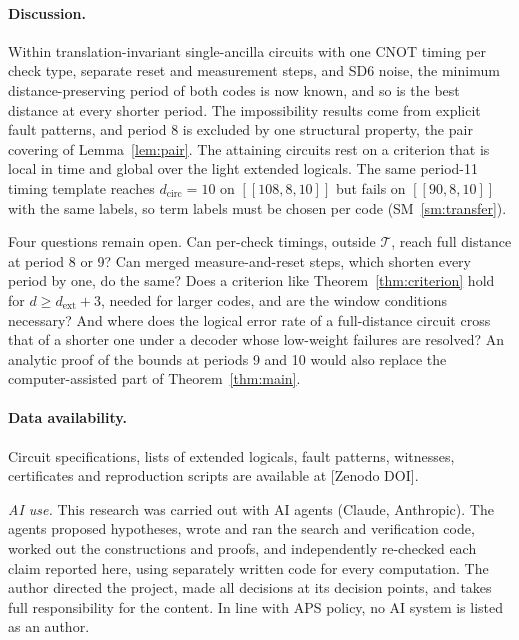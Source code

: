\documentclass[aps,prl,twocolumn,superscriptaddress,nofootinbib]{revtex4-2}
\newif\ifshowclaimtags \showclaimtagsfalse
\newcommand{\cl}[1]{\ifshowclaimtags\textsuperscript{\textcolor{blue}{\scriptsize[#1]}}\fi}
\newcommand{\dcirc}{d_{\mathrm{circ}}}
\newcommand{\dext}{d_{\mathrm{ext}}}
\newcommand{\code}[1]{[[#1]]}
\newcommand{\T}{\mathcal{T}}
\begin{document}
\paragraph{Discussion.}
Within translation-invariant single-ancilla circuits with one CNOT timing per check type,
separate reset and measurement steps, and SD6 noise, the minimum distance-preserving
period of both codes is now known, and so is the best distance at every shorter period.
The impossibility results come from explicit fault patterns, and period 8 is excluded by one
structural property, the pair covering of Lemma~\ref{lem:pair}. The attaining circuits rest on
a criterion that is local in time and global over the light extended logicals. The same
period-11 timing template reaches $\dcirc=10$ on $\code{108,8,10}$ but fails on
$\code{90,8,10}$ with the same labels, so term labels must be chosen per code
(SM~\ref{sm:transfer})\cl{L-20}.

Four questions remain open. Can per-check timings, outside $\T$, reach full distance at
period 8 or 9? Can merged measure-and-reset steps, which shorten every period by one, do the
same? Does a criterion like Theorem~\ref{thm:criterion} hold for $d\ge\dext+3$, needed for
larger codes, and are the window conditions necessary? And where does the logical error
rate of a full-distance circuit cross that of a shorter one under a decoder whose low-weight
failures are resolved? An analytic proof of the bounds at periods 9 and 10 would also
replace the computer-assisted part of Theorem~\ref{thm:main}.

\paragraph{Data availability.}
Circuit specifications, lists of extended logicals, fault patterns, witnesses,
certificates and reproduction scripts are available at [Zenodo DOI].

\begin{acknowledgments}
\emph{AI use.} This research was carried out with AI agents (Claude, Anthropic).
The agents proposed hypotheses, wrote and ran the search and verification code,
worked out the constructions and proofs, and independently re-checked each claim
reported here, using separately written code for every computation. The author directed the project, made all decisions
at its decision points, and takes full responsibility for the content. In line
with APS policy, no AI system is listed as an author.
\end{acknowledgments}
\end{document}
